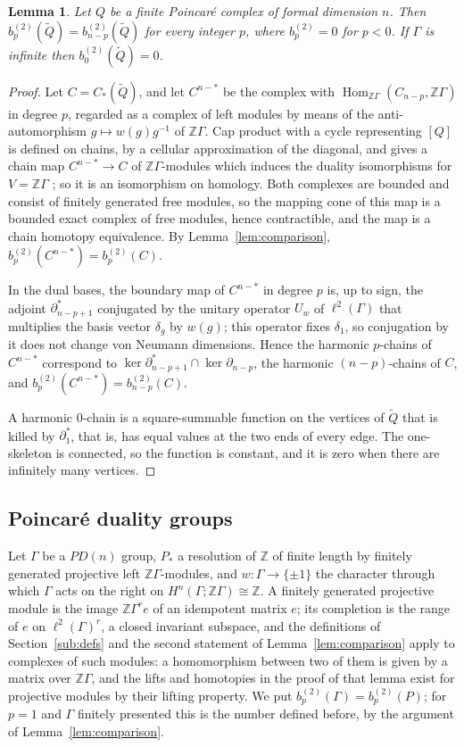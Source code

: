 \documentclass[11pt,a4paper]{article}
\newtheorem{lemma}{Lemma}[section]
\theoremstyle{definition}
\theoremstyle{remark}
\newcommand{\Z}{\mathbb{Z}}
\newcommand{\Gam}{\Gamma}
\newcommand{\lt}{\ell^2}
\newcommand{\bt}[1]{b^{(2)}_{#1}}
\newcommand{\Hom}{\operatorname{Hom}}
\begin{document}
\begin{lemma}\label{lem:l2duality}
Let $Q$ be a finite Poincar\'e complex of formal dimension $n$. Then
$\bt{p}(\widetilde Q)=\bt{n-p}(\widetilde Q)$ for every integer $p$, where
$\bt{p}=0$ for $p<0$. If $\Gam$ is infinite then $\bt{0}(\widetilde Q)=0$.
\end{lemma}
\begin{proof}
Let $C=C_*(\widetilde Q)$, and let $C^{n-*}$ be the complex with
$\Hom_{\Z\Gam}(C_{n-p},\Z\Gam)$ in degree $p$, regarded as a complex of left modules
by means of the anti-automorphism $g\mapsto w(g)g^{-1}$ of $\Z\Gam$. Cap product
with a cycle representing $[Q]$ is defined on chains, by a cellular approximation
of the diagonal, and gives a chain map $C^{n-*}\to C$ of $\Z\Gam$-modules which
induces the duality isomorphisms for $V=\Z\Gam$ \cite[Section~1]{W}; so it is an
isomorphism on homology. Both
complexes are bounded and consist of finitely generated free modules, so the
mapping cone of this map is a bounded exact complex of free modules, hence
contractible, and the map is a chain homotopy equivalence. By
Lemma~\ref{lem:comparison}, $\bt{p}(C^{n-*})=\bt{p}(C)$.

In the dual bases, the boundary map of $C^{n-*}$ in degree $p$ is, up to sign,
the adjoint $\partial_{n-p+1}^*$ conjugated by the unitary operator $U_w$ of
$\lt(\Gam)$ that multiplies the basis vector $\delta_g$ by $w(g)$; this operator
fixes $\delta_1$, so conjugation by it does not change von Neumann dimensions.
Hence the harmonic $p$-chains of $C^{n-*}$ correspond to
$\ker\partial_{n-p+1}^*\cap\ker\partial_{n-p}$, the harmonic $(n-p)$-chains of
$C$, and $\bt{p}(C^{n-*})=\bt{n-p}(C)$.

A harmonic $0$-chain is a square-summable function on the vertices of
$\widetilde Q$ that is killed by $\partial_1^*$, that is, has equal values at the
two ends of every edge. The one-skeleton is connected, so the function is
constant, and it is zero when there are infinitely many vertices.
\end{proof}

\subsection{Poincar\'e duality groups}\label{sub:pd}
Let $\Gam$ be a $PD(n)$ group, $P_*$ a resolution of $\Z$ of finite length by finitely
generated projective left $\Z\Gam$-modules, and $w:\Gam\to\{\pm1\}$ the character
through which $\Gam$ acts on the right on $H^n(\Gam;\Z\Gam)\cong\Z$. A finitely generated
projective module is the image $\Z\Gam^r e$ of an idempotent matrix $e$; its
completion is the range of $e$ on $\lt(\Gam)^r$, a closed invariant subspace, and
the definitions of Section~\ref{sub:defs} and the second statement of
Lemma~\ref{lem:comparison} apply to complexes
of such modules: a homomorphism between two of them is given by a matrix over
$\Z\Gam$, and the lifts and homotopies in the proof of that lemma exist for
projective modules by their lifting property. We put
$\bt{p}(\Gam)=\bt{p}(P)$; for $p=1$ and $\Gam$ finitely presented this is the number
defined before, by the argument of Lemma~\ref{lem:comparison}.
\end{document}
